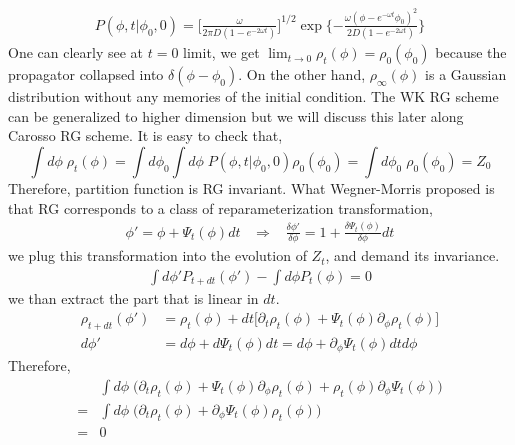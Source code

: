 \documentclass[a4paper,11pt]{article}
\begin{document}
\begin{equation}
\begin{split}
P(\phi, t | \phi_0,0)=\Big[\frac{\omega}{2\pi D(1-e^{-2\omega t})} \Big]^{1/2} \exp\{ -\frac{\omega(\phi-e^{-\omega t}\phi_0)^2}{2D(1-e^{-2\omega t})}\}
\end{split}
\end{equation}
One can clearly see at $t=0$ limit, we get $\lim_{t\rightarrow 0}\rho_t(\phi)=\rho_0(\phi_0)$ because the propagator collapsed into $\delta(\phi-\phi_0)$. On the other hand, $\rho_{\infty}(\phi)$ is a Gaussian distribution without any memories of the initial condition. The WK RG scheme can be generalized to higher dimension but we will discuss this later along Carosso RG scheme. It is easy to check that,
\begin{equation}
\int d\phi\; \rho_t(\phi)=\int d\phi_0\int d\phi\; P(\phi, t | \phi_0,0)\rho_0(\phi_0)=\int d\phi_0\; \rho_0(\phi_0)=Z_0
\end{equation}
Therefore, partition function is RG invariant. What Wegner-Morris proposed is that RG corresponds to a class of reparameterization transformation,
\begin{equation}
\begin{split}
\phi'=\phi+\Psi_t(\phi) dt \;\;\; \Rightarrow \;\;\; \frac{\delta \phi'}{\delta \phi}=1+ \frac{\delta \Psi_t(\phi)}{\delta \phi} dt
\end{split}
\end{equation}
we plug this transformation into the evolution of $Z_t$, and demand its invariance.
\begin{equation}
\begin{split}
\int d\phi' P_{t+d t}(\phi') - \int d\phi P_{t}(\phi) =0
\end{split}
\end{equation}
we than extract the part that is linear in $dt$. 
\begin{equation}
\begin{split}
\rho_{t+d t}(\phi') &=\rho_{t}(\phi)+ dt\Big[ \partial_t\rho_{t}(\phi)+\Psi_t(\phi) \partial_{\phi}\rho_{t}(\phi) \Big] \\
d\phi'&=d\phi+d\Psi_t(\phi) dt =d\phi+\partial_{\phi}\Psi_t(\phi) dtd \phi
\end{split}
\end{equation}
Therefore,
\begin{equation}
\begin{split}
&\int d\phi \; \Big(\partial_t\rho_{t}(\phi)+\Psi_t(\phi) \partial_{\phi}\rho_{t}(\phi) +\rho_{t}(\phi) \partial_{\phi}\Psi_t(\phi) \Big) \\
=&\int d\phi \; \Big(\partial_t\rho_{t}(\phi)+ \partial_{\phi}\Psi_t(\phi)\rho_{t}(\phi) \Big) \\
=& 0
\end{split}
\end{equation}
\end{document}
